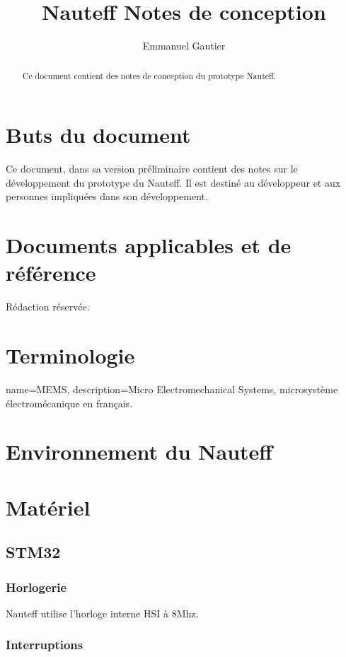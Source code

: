 \documentclass[a4paper,11pt]{report}
\title{Nauteff Notes de conception}
\author{Emmanuel Gautier}
\begin{document}
\maketitle

\begin{abstract}
Ce document contient des notes de conception du prototype Nauteff.
\end{abstract}

\tableofcontents
\chapter{Buts du document}
Ce document, dans sa version préliminaire contient des notes
sur le développement du prototype du Nauteff.
Il est destiné au développeur et aux personnes impliquées dans son
développement.

\chapter{Documents applicables et de référence}
Rédaction réservée.
\chapter{Terminologie}
\printglossary

{
  name={MEMS},
  description={Micro Electromechanical Systems, microsystème électromécanique en français.}
}

\chapter{Environnement du Nauteff}
\chapter{Matériel}
\section{STM32}
\subsection{Horlogerie}
Nauteff utilise l'horloge interne HSI à 8Mhz.

\subsection{Interruptions}
\end{document}
